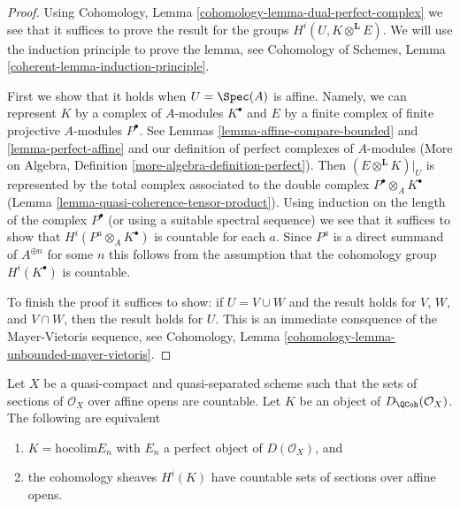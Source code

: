 \begin{proof}
Using Cohomology, Lemma \ref{cohomology-lemma-dual-perfect-complex}
we see that it suffices to prove the result
for the groups $H^i(U, K \otimes^\mathbf{L} E)$.
We will use the induction principle to prove the lemma, see
Cohomology of Schemes, Lemma \ref{coherent-lemma-induction-principle}.

\medskip\noindent
First we show that it holds when $U = \Spec(A)$ is affine. Namely, we can
represent $K$ by a complex of $A$-modules $K^\bullet$ and $E$ by a
finite complex of finite projective $A$-modules $P^\bullet$.
See Lemmas \ref{lemma-affine-compare-bounded} and
\ref{lemma-perfect-affine}
and our definition of perfect complexes of $A$-modules
(More on Algebra, Definition \ref{more-algebra-definition-perfect}).
Then $(E \otimes^\mathbf{L} K)|_U$ is represented by
the total complex associated to the double complex
$P^\bullet \otimes_A K^\bullet$
(Lemma \ref{lemma-quasi-coherence-tensor-product}).
Using induction on the length of the complex
$P^\bullet$ (or using a suitable spectral sequence)
we see that it suffices to show that
$H^i(P^a \otimes_A K^\bullet)$ is countable for each $a$.
Since $P^a$ is a direct summand of $A^{\oplus n}$ for
some $n$ this follows from the assumption that
the cohomology group $H^i(K^\bullet)$ is countable.

\medskip\noindent
To finish the proof it suffices to show: if $U = V \cup W$
and the result holds for $V$, $W$, and $V \cap W$, then
the result holds for $U$. This is an immediate consquence
of the Mayer-Vietoris sequence, see
Cohomology, Lemma \ref{cohomology-lemma-unbounded-mayer-vietoris}.
\end{proof}

\begin{lemma}
\label{lemma-countable}
Let $X$ be a quasi-compact and quasi-separated scheme such that
the sets of sections of $\mathcal{O}_X$ over affine opens are countable.
Let $K$ be an object of $D_\QCoh(\mathcal{O}_X)$. The
following are equivalent
\begin{enumerate}
\item $K = \text{hocolim} E_n$ with $E_n$ a perfect object of
$D(\mathcal{O}_X)$, and
\item the cohomology sheaves $H^i(K)$ have countable
sets of sections over affine opens.
\end{enumerate}
\end{lemma}

